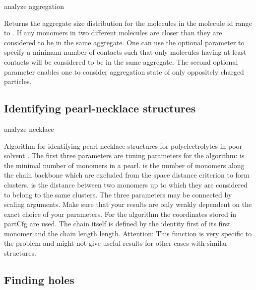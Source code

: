 \begin{essyntax}
  analyze aggregation  
   
\end{essyntax}
Returns the aggregate size distribution for the molecules in the
molecule id range  to . If any
monomers in two different molecules are closer than
 they are considered to be in the same aggregate.
One can use the optional  parameter to specify a
minimum number of contacts such that only molecules having at least
 contacts will be considered to be in the same
aggregate. The second optional parameter 
enables one to consider aggregation state of only oppositely charged
particles.

\subsection{Identifying pearl-necklace structures}
\label{analyze:necklace}

\begin{essyntax}
 analyze necklace   
  
\end{essyntax}
Algorithm for identifying pearl necklace structures for
polyelectrolytes in poor solvent \citep{limbach03a}. The first three
parameters are tuning parameters for the algorithm:
 is the minimal number of monomers in a pearl.
 is the number of monomers along the chain backbone
which are excluded from the space distance criterion to form clusters.
 is the distance between two monomers up to which
they are considered to belong to the same clusters. The three
parameters may be connected by scaling arguments. Make sure that your
results are only weakly dependent on the exact choice of your
parameters. For the algorithm the coordinates stored in partCfg are
used. The chain itself is defined by the identity first of its first
monomer and the chain length length.  Attention: This function is very
specific to the problem and might not give useful results for other
cases with similar structures.

\subsection{Finding holes}
\label{analyze:holes}

